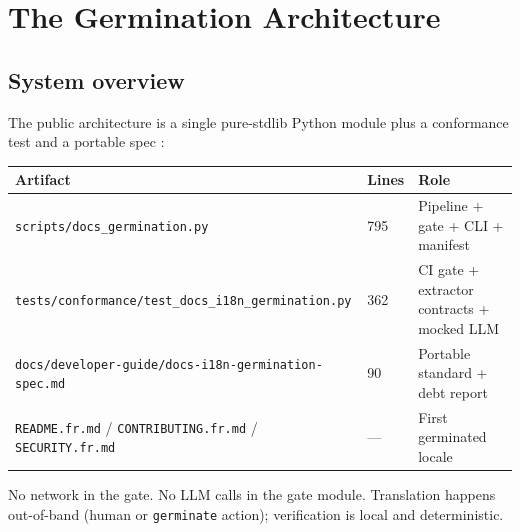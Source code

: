 \documentclass[11pt]{article}
\theoremstyle{definition}
\theoremstyle{plain}
\theoremstyle{remark}
\begin{document}
\section{The Germination Architecture}
\label{sec:architecture}

\subsection{System overview}

The public architecture is a single pure-stdlib Python module plus a
conformance test and a portable spec
\citep{hermespr80391,hermesspec}:

\begin{center}
\begin{tabular}{@{}llp{}@{}}
\toprule
Artifact & Lines & Role \\
\midrule
\texttt{scripts/docs\_germination.py} & 795 & Pipeline + gate + CLI + manifest \\
\texttt{tests/conformance/test\_docs\_i18n\_germination.py} & 362 & CI gate + extractor contracts + mocked LLM \\
\texttt{docs/developer-guide/docs-i18n-germination-spec.md} & 90 & Portable standard + debt report \\
\texttt{README.fr.md} / \texttt{CONTRIBUTING.fr.md} / \texttt{SECURITY.fr.md} & --- & First germinated locale \\
\bottomrule
\end{tabular}
\end{center}

No network in the gate. No LLM calls in the gate module. Translation happens
out-of-band (human or \texttt{germinate} action); verification is local and
deterministic.
\end{document}
